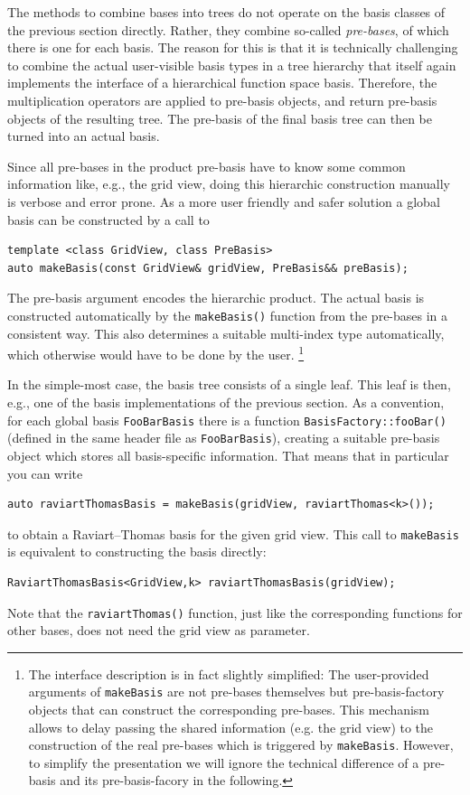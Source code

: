 \documentclass[a4paper,10pt,headings=normal,bibliography=totoc]{scrartcl}
\newcommand{\cpp}[1]{\lstinline[basicstyle=\ttfamily]!#1!}
\begin{document}
The methods to combine bases into trees do not operate on the basis classes of the previous section
directly.  Rather, they combine so-called \emph{pre-bases}, of which there is one for each basis.
The reason for this is
that it is technically challenging to combine the actual user-visible basis types in a
tree hierarchy that itself again implements the interface of a hierarchical function space basis.
Therefore, the multiplication operators are applied to pre-basis objects, and return pre-basis
objects of the resulting tree.
The pre-basis of the final basis tree can then be turned into an actual basis.

Since all pre-bases in the product pre-basis have to know some common information
like, e.g., the grid view, doing this hierarchic construction
manually is verbose and error prone. As a more user friendly and safer solution
a global basis can be constructed by a call to
\begin{lstlisting}[style=Interface]
template <class GridView, class PreBasis>
auto makeBasis(const GridView& gridView, PreBasis&& preBasis);
\end{lstlisting}
The pre-basis argument encodes the hierarchic product.
The actual basis is constructed automatically by the
\cpp{makeBasis()} function from the pre-bases in a consistent way.
This also determines a suitable multi-index type automatically,
which otherwise would have to be done by the user.
\footnote{The interface description is in fact slightly simplified:
The user-provided arguments of \cpp{makeBasis} are not pre-bases themselves
but pre-basis-factory objects that can construct the corresponding pre-bases.
This mechanism allows to delay passing the shared information
(e.g. the grid view) to the construction of the real pre-bases which is triggered
by \cpp{makeBasis}. However, to simplify the presentation
we will ignore the technical difference of a pre-basis
and its pre-basis-facory in the following.}

In the simple-most case, the basis tree consists of a single leaf.
This leaf is then, e.g., one of the basis implementations of the previous section.
As a convention, for each global basis
\cpp{FooBarBasis} there is a function \cpp{BasisFactory::fooBar()}
(defined in the same header file as \cpp{FooBarBasis}),
creating a suitable pre-basis object which
stores all basis-specific information.
That means that in particular you can write
\begin{lstlisting}[style=Example]
auto raviartThomasBasis = makeBasis(gridView, raviartThomas<k>());
\end{lstlisting}
to obtain a Raviart--Thomas basis for the given grid view.
This call to \cpp{makeBasis} is equivalent to constructing
the basis directly:
\begin{lstlisting}[style=Example]
RaviartThomasBasis<GridView,k> raviartThomasBasis(gridView);
\end{lstlisting}
Note that the \cpp{raviartThomas()} function, just like the corresponding functions for other bases, does not need
the grid view as parameter.
\end{document}
